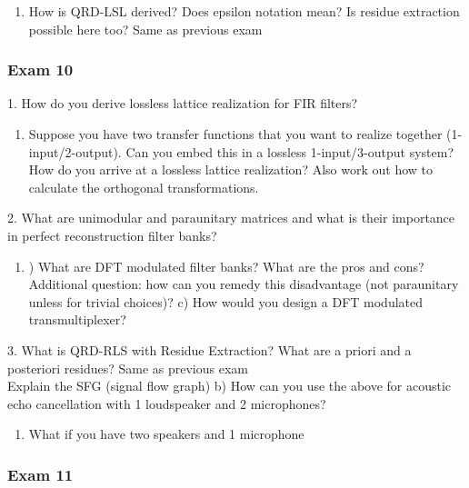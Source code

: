 \documentclass[
  a4paper,
  ,captions=tableheading
]{scrartcl}
\providecommand{\tightlist}{%
  \setlength{\itemsep}{0pt}\setlength{\parskip}{0pt}}
\begin{document}
\begin{enumerate}
\def\labelenumi{\arabic{enumi}.}
\tightlist
\item
  How is QRD-LSL derived? Does epsilon notation mean? Is residue
  extraction possible here too? Same as previous exam
\end{enumerate}

\subsubsection{Exam 10}\label{exam-10}

1. How do you derive lossless lattice realization for FIR filters?

\begin{enumerate}
\def\labelenumi{\arabic{enumi}.}
\tightlist
\item
  Suppose you have two transfer functions that you want to realize
  together (1-input/2-output). Can you embed this in a lossless
  1-input/3-output system? How do you arrive at a lossless lattice
  realization? Also work out how to calculate the orthogonal
  transformations.
\end{enumerate}

2. What are unimodular and paraunitary matrices and what is their
importance in perfect reconstruction filter banks?

\begin{enumerate}
\def\labelenumi{\arabic{enumi}.}
\tightlist
\item
  ) What are DFT modulated filter banks? What are the pros and cons?
  Additional question: how can you remedy this disadvantage (not
  paraunitary unless for trivial choices)? c) How would you design a DFT
  modulated transmultiplexer?
\end{enumerate}

3. What is QRD-RLS with Residue Extraction? What are a priori and a
posteriori residues? Same as previous exam\\
Explain the SFG (signal flow graph) b) How can you use the above for
acoustic echo cancellation with 1 loudspeaker and 2 microphones?

\begin{enumerate}
\def\labelenumi{\arabic{enumi}.}
\tightlist
\item
  What if you have two speakers and 1 microphone
\end{enumerate}

\subsubsection{Exam 11}\label{exam-11}
\end{document}

